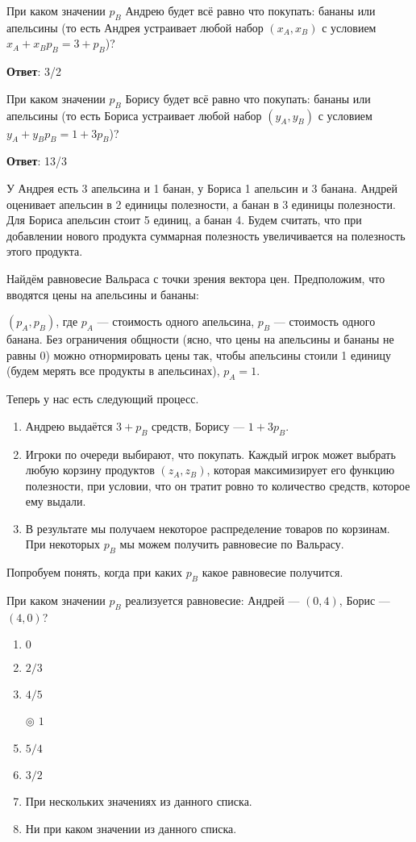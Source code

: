 	При каком значении $p_B$ Андрею будет всё равно что покупать: бананы или апельсины (то есть Андрея устраивает любой набор $(x_A,x_B)$ с условием $x_A + x_B p_B = 3 + p_B$)?
	
\textbf{Ответ}:
3/2	%

\task
При каком значении $p_B$ Борису будет всё равно что покупать: бананы или апельсины (то есть Бориса устраивает любой набор $(y_A,y_B)$ с условием $y_A + y_Bp_B = 1 + 3p_B$)?

\textbf{Ответ}: 
13/3

\task
У Андрея есть 3 апельсина и 1 банан, у Бориса 1 апельсин и 3 банана. Андрей оценивает апельсин в 2 единицы полезности, а банан в 3 единицы полезности. Для Бориса апельсин стоит 5 единиц, а банан 4. Будем считать, что при добавлении нового продукта суммарная полезность увеличивается на полезность этого продукта.

Найдём равновесие Вальраса с точки зрения вектора цен. Предположим, что вводятся цены на апельсины и бананы:

$(p_A,p_B)$, где $p_A$ --- стоимость одного апельсина, $p_B$ --- стоимость одного банана. Без ограничения общности (ясно, что цены на апельсины и бананы не равны 0) можно отнормировать цены так, чтобы апельсины стоили 1 единицу (будем мерять все продукты в апельсинах), $p_A=1$.

Теперь у нас есть следующий процесс.

\begin{enumerate}
	\item Андрею выдаётся $3+p_B$ средств, Борису --- $1+3p_B$.
	\item Игроки по очереди выбирают, что покупать. Каждый игрок может выбрать любую корзину продуктов $(z_A,z_B)$, которая максимизирует его функцию полезности, при условии, что он тратит ровно то количество средств, которое ему выдали.
	\item В результате мы получаем некоторое распределение товаров по корзинам. При некоторых $p_B$ мы можем получить равновесие по Вальрасу.
\end{enumerate}
Попробуем понять, когда при каких $p_B$ какое равновесие получится.

При каком значении $p_B$ реализуется равновесие: Андрей --- $(0,4)$, Борис --- $(4,0)$?

\begin{enumerate}[label=$\circ$]	%
	\item $0$
	\item $2/3$
	\item $4/5$
	\item[$\circledcirc$] $1$
	\item $5/4$
	\item $3/2$
	\item При нескольких значениях из данного списка.
	\item Ни при каком значении из данного списка.
\end{enumerate}


